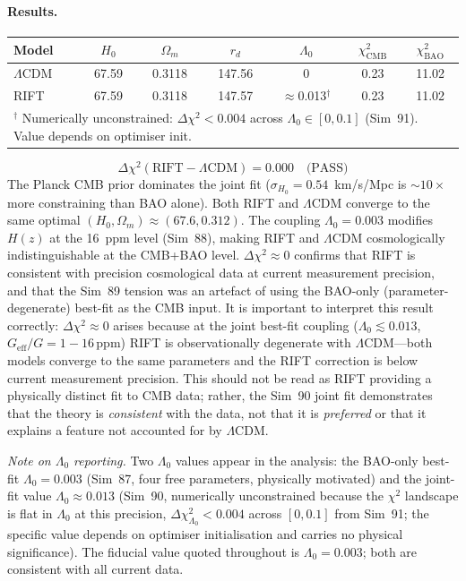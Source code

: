 \documentclass[12pt,a4paper]{article}
\begin{document}
\paragraph{Results.}
\begin{center}
\begin{tabular}{lcccccc}
\toprule
Model & $H_0$ & $\Omega_m$ & $r_d$ & $\Lambda_0$ & $\chi^2_{\mathrm{CMB}}$ & $\chi^2_{\mathrm{BAO}}$ \\
\midrule
$\Lambda$CDM & 67.59 & 0.3118 & 147.56 & 0 & 0.23 & 11.02 \\
RIFT & 67.59 & 0.3118 & 147.57 & $\approx$0.013$^\dagger$ & 0.23 & 11.02 \\
\bottomrule
\multicolumn{7}{l}{\footnotesize $^\dagger$ Numerically unconstrained: $\Delta\chi^2<0.004$ across $\Lambda_0\in[0,0.1]$ (Sim~91). Value depends on optimiser init.} \\
\end{tabular}
\end{center}
\begin{equation*}
\Delta\chi^2(\mathrm{RIFT} - \Lambda\mathrm{CDM}) = \mathbf{0.000} \quad\text{(PASS)}
\end{equation*}
The Planck CMB prior dominates the joint fit ($\sigma_{H_0} = 0.54$~km/s/Mpc
is $\sim 10\times$ more constraining than BAO alone). Both RIFT and $\Lambda$CDM
converge to the same optimal $(H_0, \Omega_m) \approx (67.6, 0.312)$. The coupling
$\Lambda_0 = 0.003$ modifies $H(z)$ at the 16~ppm level (Sim~88), making RIFT
and $\Lambda$CDM cosmologically indistinguishable at the CMB+BAO level.
$\Delta\chi^2 \approx 0$ confirms that RIFT is consistent with precision cosmological
data at current measurement precision, and that the Sim~89 tension was an artefact
of using the BAO-only (parameter-degenerate) best-fit as the CMB input.
It is important to interpret this result correctly: $\Delta\chi^2 \approx 0$ arises
because at the joint best-fit coupling ($\Lambda_0 \lesssim 0.013$,
$G_{\mathrm{eff}}/G = 1 - 16\,\mathrm{ppm}$) RIFT is observationally degenerate
with $\Lambda$CDM---both models converge to the same parameters and the RIFT
correction is below current measurement precision.  This should not be read as
RIFT providing a physically distinct fit to CMB data; rather, the Sim~90 joint
fit demonstrates that the theory is \emph{consistent} with the data, not that
it is \emph{preferred} or that it explains a feature not accounted for by $\Lambda$CDM.

\emph{Note on $\Lambda_0$ reporting.} Two $\Lambda_0$ values appear in the analysis:
the BAO-only best-fit $\Lambda_0 = 0.003$ (Sim~87, four free parameters, physically
motivated) and the joint-fit value $\Lambda_0 \approx 0.013$ (Sim~90, numerically
unconstrained because the $\chi^2$ landscape is flat in $\Lambda_0$ at this precision,
$\Delta\chi^2_{\Lambda_0} < 0.004$ across $[0, 0.1]$ from Sim~91; the specific
value depends on optimiser initialisation and carries no physical significance). The fiducial
value quoted throughout is $\Lambda_0 = 0.003$; both are consistent with all current
data.
\end{document}
